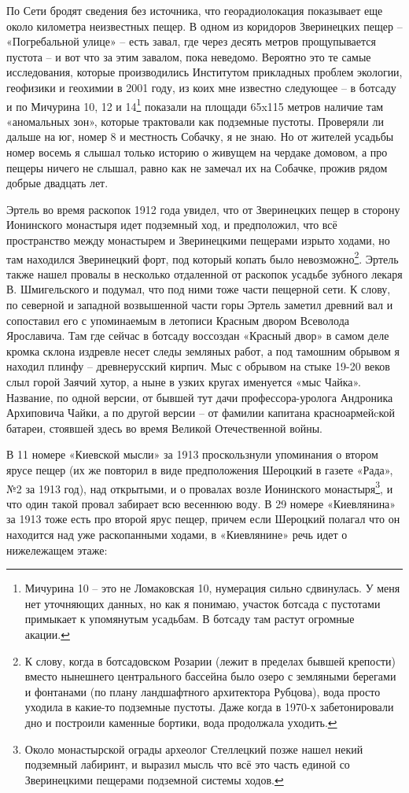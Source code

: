 По Сети бродят сведения без источника, что георадиолокация показывает еще около километра неизвестных пещер. В одном из коридоров Зверинецких пещер – «Погребальной улице» – есть завал, где через десять метров прощупывается пустота – и вот что за этим завалом, пока неведомо. Вероятно это те самые исследования, которые производились Институтом прикладных проблем экологии, геофизики и геохимии в 2001 году, из коих мне известно следующее – в ботсаду и по Мичурина 10, 12 и 14\footnote{Мичурина 10 – это не Ломаковская 10, нумерация сильно сдвинулась. У меня нет уточняющих данных, но как я понимаю, участок ботсада с пустотами примыкает к упомянутым усадьбам. В ботсаду там растут огромные акации.} показали на площади 65x115 метров наличие там «аномальных зон», которые трактовали как подземные пустоты. Проверяли ли дальше на юг, номер 8 и местность Собачку, я не знаю. Но от жителей усадьбы номер восемь я слышал только историю о живущем на чердаке домовом, а про пещеры ничего не слышал, равно как не замечал их на Собачке, прожив рядом добрые двадцать лет.

Эртель во время раскопок 1912 года увидел, что от Зверинецких пещер в сторону Ионинского монастыря идет подземный ход, и предположил, что всё пространство между монастырем и Зверинецкими пещерами изрыто ходами, но там находился Зверинецкий форт, под который копать было невозможно\footnote{К слову, когда в ботсадовском Розарии (лежит в пределах бывшей крепости) вместо нынешнего центрального бассейна было озеро с земляными берегами и фонтанами (по плану ландшафтного архитектора Рубцова), вода просто уходила в какие-то подземные пустоты. Даже когда в 1970-х забетонировали дно и построили каменные бортики, вода продолжала уходить.}. Эртель также нашел провалы в несколько отдаленной от раскопок усадьбе зубного лекаря В. Шмигельского и подумал, что под ними тоже части пещерной сети. К слову, по северной и западной возвышенной части горы Эртель заметил древний вал и сопоставил его с упоминаемым в летописи Красным двором Всеволода Ярославича. Там где сейчас в ботсаду воссоздан «Красный двор» в самом деле кромка склона издревле несет следы земляных работ, а под тамошним обрывом я находил плинфу – древнерусский кирпич. Мыс с обрывом на стыке 19-20 веков слыл горой Заячий хутор, а ныне в узких кругах именуется «мыс Чайка». Название, по одной версии, от бывшей тут дачи профессора-уролога Андроника Архиповича Чайки, а по другой версии – от фамилии капитана красноармейcкой батареи, стоявшей здесь во время Великой Отечественной войны.

В 11 номере «Киевской мысли» за 1913 проскользнули упоминания о втором ярусе пещер (их же повторил в виде предположения Шероцкий в газете «Рада», №2 за 1913 год), над открытыми, и о провалах возле Ионинского монастыря\footnote{Около монастырской ограды археолог Стеллецкий позже нашел некий подземный лабиринт, и выразил мысль что всё это часть единой со Зверинецкими пещерами подземной системы ходов.}, и что один такой провал забирает всю весеннюю воду. В 29 номере «Киевлянина» за 1913 тоже есть про второй ярус пещер, причем если Шероцкий полагал что он находится над уже раскопанными ходами, в «Киевлянине» речь идет о нижележащем этаже:

